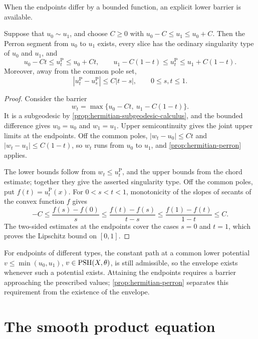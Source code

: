 When the endpoints differ by a bounded function, an explicit lower barrier is available.

\begin{theorem}
\label{thm:ordinary-type-perron}
Suppose that $u_0\sim u_1$, and choose $C\geq0$ with
$u_0-C\leq u_1\leq u_0+C$. Then the Perron segment from $u_0$ to $u_1$ exists, every slice has the ordinary singularity type of $u_0$ and $u_1$, and
\[
 u_0-Ct\leq u_t^{\mathrm P}\leq u_0+Ct,
 \qquad
 u_1-C(1-t)\leq u_t^{\mathrm P}\leq u_1+C(1-t).
\]
Moreover, away from the common pole set,
\[
 |u_t^{\mathrm P}-u_s^{\mathrm P}|\leq C|t-s|,
 \qquad0\leq s,t\leq1.
\]
\end{theorem}
\begin{proof}
Consider the barrier
\[
 w_t=\max\{u_0-Ct,\ u_1-C(1-t)\}.
\]
It is a subgeodesic by \cref{prop:hermitian-subgeodesic-calculus}, and the bounded difference gives $w_0=u_0$ and $w_1=u_1$. Upper semicontinuity gives the joint upper limits at the endpoints. Off the common poles, $|w_t-u_0|\leq Ct$ and $|w_t-u_1|\leq C(1-t)$, so $w_t$ runs from $u_0$ to $u_1$, and \cref{prop:hermitian-perron} applies.

The lower bounds follow from $w_t\leq u_t^{\mathrm P}$, and the upper bounds from the chord estimate; together they give the asserted singularity type. Off the common poles, put $f(t)=u_t^{\mathrm P}(x)$. For $0<s<t<1$, monotonicity of the slopes of secants of the convex function $f$ gives
\[
 -C\leq\frac{f(s)-f(0)}s
 \leq\frac{f(t)-f(s)}{t-s}
 \leq\frac{f(1)-f(t)}{1-t}\leq C.
\]
The two-sided estimates at the endpoints cover the cases $s=0$ and $t=1$, which proves the Lipschitz bound on $[0,1]$.
\end{proof}

For endpoints of different types, the constant path at a common lower potential $v\leq\min(u_0,u_1)$, $v\in\mathrm{PSH}(X,\theta)$, is still admissible, so the envelope exists whenever such a potential exists. Attaining the endpoints requires a barrier approaching the prescribed values; \cref{prop:hermitian-perron} separates this requirement from the existence of the envelope.

\section{The smooth product equation}

